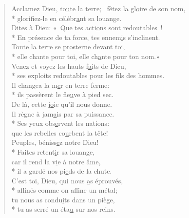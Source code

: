 
\begin{verse}
Acclamez Dieu, to\underline{u}te la terre;~\psalmdagger
{}fêtez la gl\underline{o}ire de son nom, \\*
glorifiez-le en célébr\underline{a}nt sa louange. \\

Dites à Dieu: « Que tes acti\underline{o}ns sont redoutables ! \\*
En présence de ta force, tes ennem\underline{i}s s’inclinent. \\
Toute la terre se prost\underline{e}rne devant toi, \\*
elle chante pour toi, elle ch\underline{a}nte pour ton nom.» \\

Venez et voyez les hauts f\underline{a}its de Dieu, \\*
ses exploits redoutables pour les f\underline{i}ls des hommes. \\
Il changea la m\underline{e}r en terre ferme: \\*
ils passèrent le fle\underline{u}ve à pied sec. \\

De là, cette j\underline{o}ie qu’il nous donne. \\
Il règne à jam\underline{a}is par sa puissance. \\*
Ses yeux obs\underline{e}rvent les nations: \\
que les rebelles co\underline{u}rbent la tête! \\

Peuples, béniss\underline{e}z notre Dieu! \\*
Faites retent\underline{i}r sa louange, \\
car il rend la v\underline{i}e à notre âme, \\*
il a gardé nos pi\underline{e}ds de la chute. \\

C’est toi, Dieu, qui nous \underline{a}s éprouvés, \\*
affinés comme on aff\underline{i}ne un métal; \\
tu nous as condu\underline{i}ts dans un piège, \\*
tu as serré un éta\underline{u} sur nos reins. \\


\end{verse}
